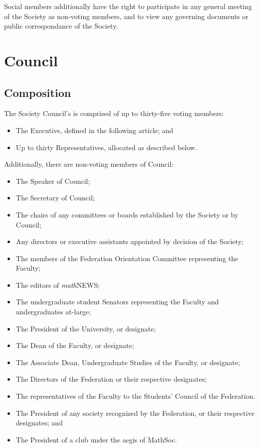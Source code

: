 Social members additionally have the right to participate in any general meeting
of the Society as non-voting members, and to view any governing documents or
public correspondance of the Society.

\section{Council}
\subsection{Composition}
The Society Council's is comprised of up to thirty-five voting members:
\begin{itemize}
  \item The Executive, defined in the following article; and
  \item Up to thirty Representatives, allocated as described below.
\end{itemize}

\noindent Additionally, there are non-voting members of Council:
\begin{itemize}
  \item The Speaker of Council;
  \item The Secretary of Council;
  \item The chairs of any committees or boards established by the Society or by
    Council;
  \item Any directors or executive assistants appointed by decision of the
    Society;
  \item The members of the Federation Orientation Committee representing the
    Faculty;
  \item The editors of \emph{math}{\sf NEWS};
  \item The undergraduate student Senators representing the Faculty and
    undergraduates at-large;
  \item The President of the University, or designate;
  \item The Dean of the Faculty, or designate;
  \item The Associate Dean, Undergraduate Studies of the Faculty, or designate;
  \item The Directors of the Federation or their respective designates;
  \item The representatives of the Faculty to the Students' Council of the
    Federation.
  \item The President of any society recognized by the Federation, or their
    respective designates; and
  \item The President of a club under the aegis of MathSoc.
\end{itemize}

